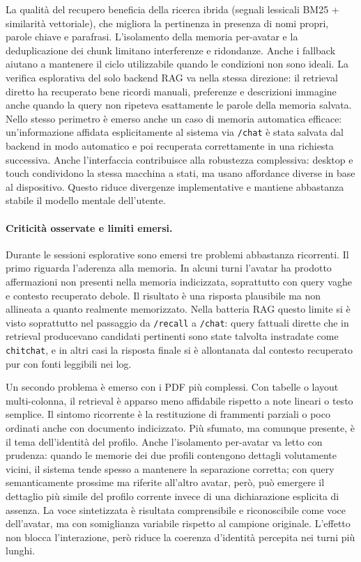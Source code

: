 La qualità del recupero beneficia della ricerca ibrida (segnali lessicali BM25 + similarità vettoriale), che migliora la pertinenza in presenza di nomi propri, parole chiave e parafrasi. L'isolamento della memoria per-avatar e la deduplicazione dei chunk limitano interferenze e ridondanze. Anche i fallback aiutano a mantenere il ciclo utilizzabile quando le condizioni non sono ideali. La verifica esplorativa del solo backend RAG va nella stessa direzione: il retrieval diretto ha recuperato bene ricordi manuali, preferenze e descrizioni immagine anche quando la query non ripeteva esattamente le parole della memoria salvata. Nello stesso perimetro è emerso anche un caso di memoria automatica efficace: un'informazione affidata esplicitamente al sistema via \texttt{/chat} è stata salvata dal backend in modo automatico e poi recuperata correttamente in una richiesta successiva. Anche l'interfaccia contribuisce alla robustezza complessiva: desktop e touch condividono la stessa macchina a stati, ma usano affordance diverse in base al dispositivo. Questo riduce divergenze implementative e mantiene abbastanza stabile il modello mentale dell'utente.

\paragraph{Criticità osservate e limiti emersi.}
\label{subsec:criticita-osservate}

Durante le sessioni esplorative sono emersi tre problemi abbastanza ricorrenti. Il primo riguarda l'aderenza alla memoria. In alcuni turni l'avatar ha prodotto affermazioni non presenti nella memoria indicizzata, soprattutto con query vaghe e contesto recuperato debole. Il risultato è una risposta plausibile ma non allineata a quanto realmente memorizzato. Nella batteria RAG questo limite si è visto soprattutto nel passaggio da \texttt{/recall} a \texttt{/chat}: query fattuali dirette che in retrieval producevano candidati pertinenti sono state talvolta instradate come \texttt{chitchat}, e in altri casi la risposta finale si è allontanata dal contesto recuperato pur con fonti leggibili nei log.

Un secondo problema è emerso con i PDF più complessi. Con tabelle o layout multi-colonna, il retrieval è apparso meno affidabile rispetto a note lineari o testo semplice. Il sintomo ricorrente è la restituzione di frammenti parziali o poco ordinati anche con documento indicizzato. Più sfumato, ma comunque presente, è il tema dell'identità del profilo. Anche l'isolamento per-avatar va letto con prudenza: quando le memorie dei due profili contengono dettagli volutamente vicini, il sistema tende spesso a mantenere la separazione corretta; con query semanticamente prossime ma riferite all'altro avatar, però, può emergere il dettaglio più simile del profilo corrente invece di una dichiarazione esplicita di assenza. La voce sintetizzata è risultata comprensibile e riconoscibile come voce dell'avatar, ma con somiglianza variabile rispetto al campione originale. L'effetto non blocca l'interazione, però riduce la coerenza d'identità percepita nei turni più lunghi.

